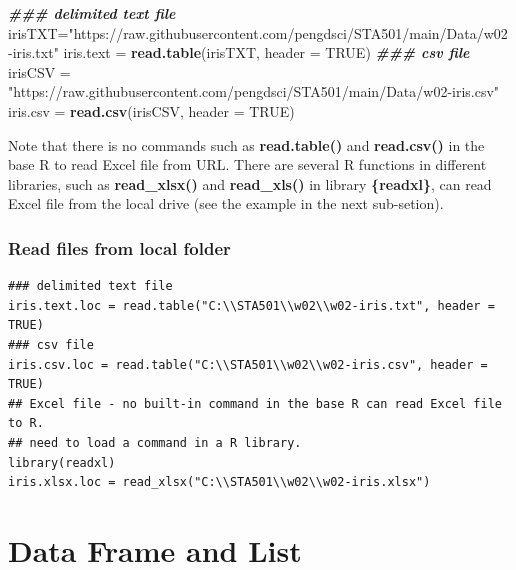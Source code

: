 \documentclass[
]{book}
\newenvironment{Shaded}{\begin{snugshade}}{\end{snugshade}}
\newcommand{\AttributeTok}[1]{\textcolor[rgb]{0.13,0.29,0.53}{#1}}
\newcommand{\ConstantTok}[1]{\textcolor[rgb]{0.56,0.35,0.01}{#1}}
\newcommand{\DocumentationTok}[1]{\textcolor[rgb]{0.56,0.35,0.01}{\textbf{\textit{#1}}}}
\newcommand{\FunctionTok}[1]{\textcolor[rgb]{0.13,0.29,0.53}{\textbf{#1}}}
\newcommand{\NormalTok}[1]{#1}
\newcommand{\OtherTok}[1]{\textcolor[rgb]{0.56,0.35,0.01}{#1}}
\newcommand{\StringTok}[1]{\textcolor[rgb]{0.31,0.60,0.02}{#1}}
\begin{document}
\begin{Shaded}
\begin{Highlighting}[]
\DocumentationTok{\#\#\# delimited text file}
\NormalTok{irisTXT}\OtherTok{=}\StringTok{"https://raw.githubusercontent.com/pengdsci/STA501/main/Data/w02{-}iris.txt"}
\NormalTok{iris.text }\OtherTok{=} \FunctionTok{read.table}\NormalTok{(irisTXT, }\AttributeTok{header =} \ConstantTok{TRUE}\NormalTok{)}
\DocumentationTok{\#\#\# csv file}
\NormalTok{irisCSV }\OtherTok{=} \StringTok{"https://raw.githubusercontent.com/pengdsci/STA501/main/Data/w02{-}iris.csv"}
\NormalTok{iris.csv }\OtherTok{=} \FunctionTok{read.csv}\NormalTok{(irisCSV, }\AttributeTok{header =} \ConstantTok{TRUE}\NormalTok{)}
\end{Highlighting}
\end{Shaded}

Note that there is no commands such as \textbf{read.table()} and \textbf{read.csv()} in the base R to read Excel file from URL. There are several R functions in different libraries, such as \textbf{read\_xlsx()} and \textbf{read\_xls()} in library \textbf{\{readxl\}}, can read Excel file from the local drive (see the example in the next sub-setion).

\hypertarget{read-files-from-local-folder}{%
\subsubsection{Read files from local folder}\label{read-files-from-local-folder}}

\begin{verbatim}
### delimited text file
iris.text.loc = read.table("C:\\STA501\\w02\\w02-iris.txt", header = TRUE)
### csv file
iris.csv.loc = read.table("C:\\STA501\\w02\\w02-iris.csv", header = TRUE)
## Excel file - no built-in command in the base R can read Excel file to R. 
## need to load a command in a R library.
library(readxl)
iris.xlsx.loc = read_xlsx("C:\\STA501\\w02\\w02-iris.xlsx")
\end{verbatim}

\hypertarget{data-frame-and-list}{%
\section{Data Frame and List}\label{data-frame-and-list}}
\end{document}
